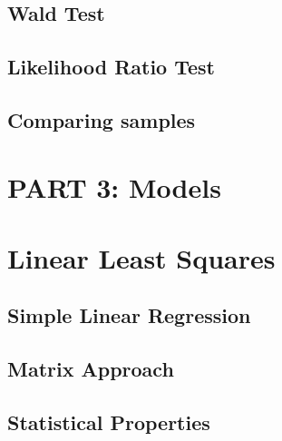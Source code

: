 \documentclass[
  openany]{book}
\theoremstyle{definition}
\theoremstyle{definition}
\theoremstyle{definition}
\theoremstyle{definition}
\theoremstyle{remark}
\begin{document}
\section{Wald Test}\label{wald-test}

\section{Likelihood Ratio Test}\label{likelihood-ratio-test}

\section{Comparing samples}\label{comparing-samples}

\chapter*{PART 3: Models}\label{part-3-models}


\chapter{Linear Least Squares}\label{linear-least-squares}

\section{Simple Linear Regression}\label{simple-linear-regression}

\section{Matrix Approach}\label{matrix-approach}

\section{Statistical Properties}\label{statistical-properties}
\end{document}
